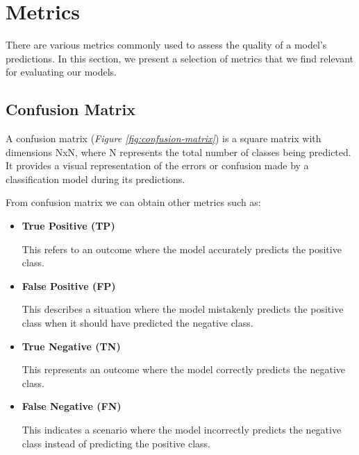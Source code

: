 \section{Metrics}
{\label{sec:metrics}}

There are various metrics commonly used to assess the quality of a model's predictions.
In this section, we present a selection of metrics that we find relevant for evaluating our models.

\subsection{Confusion Matrix}

A confusion matrix (\textit{Figure \ref{fig:confusion-matrix}}) is a square matrix with dimensions  NxN,
where  N represents the total number of classes being predicted.
It provides a visual representation of the errors or confusion made by a classification
model during its predictions. \newline

From confusion matrix we can obtain other metrics such as:

\begin{itemize}
  \item \textbf{True Positive (TP)}

    This refers to an outcome where the model accurately predicts the positive class.
  \item \textbf{False Positive (FP)}

    This describes a situation where the model mistakenly predicts the positive class when it should have predicted the negative class.
  \item \textbf{True Negative (TN)}

    This represents an outcome where the model correctly predicts the negative class.
  \item \textbf{False Negative (FN)}

    This indicates a scenario where the model incorrectly predicts the negative class instead of predicting the positive class.

\end{itemize}

